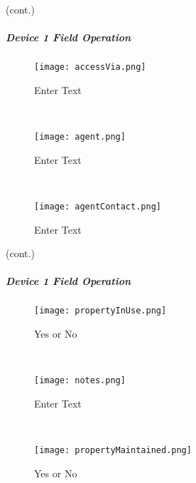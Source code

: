 {\footnotesize (cont.)}
\vspace{.8in}


\vspace{2.7in}

\vspace{2.5in}

\clearpage
\subparagraph*{Device 1 Field Operation}
\begin{wrapfigure}{r}{0.4\textwidth}
\centering
    \texttt{[image: accessVia.png]}
\caption {Enter Text}
\vspace{.05in}

\HRule \\[.4cm] %
\vspace{.05in}

    \texttt{[image: agent.png]}
\caption{Enter Text}
\vspace{.05in}

\HRule \\[.4cm] %
\vspace{.05in}

    \texttt{[image: agentContact.png]}
\caption{Enter Text}
\end{wrapfigure}

{\footnotesize (cont.)}
\vspace{1in}

\vspace{2in}

\vspace{2.7in}

\clearpage


\subparagraph*{Device 1 Field Operation}
\begin{wrapfigure}{r}{0.4\textwidth}
\centering
    \texttt{[image: propertyInUse.png]}
\caption {Yes or No}
\vspace{.05in}

\HRule \\[.4cm] %
\vspace{.1in}

    \texttt{[image: notes.png]}
\caption {Enter Text}
\vspace{.05in}

\HRule \\[.4cm] %
\vspace{.1in}

    \texttt{[image: propertyMaintained.png]}
\caption{Yes or No}
\end{wrapfigure}

